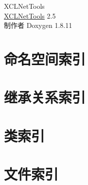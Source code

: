 \documentclass[twoside]{book}
\newcommand{\+}{\discretionary{\mbox{\scriptsize$\hookleftarrow$}}{}{}}
\newcommand{\clearemptydoublepage}{%
  \newpage{\pagestyle{empty}\cleardoublepage}%
}
\begin{document}
\hypersetup{pageanchor=false,
             bookmarksnumbered=true,
             pdfencoding=unicode
            }
\begin{titlepage}
\vspace*{7cm}
\begin{center}%
{\Large X\+C\+L\+Net\+Tools \\[1ex]\large \hyperlink{namespace_x_c_l_net_tools}{X\+C\+L\+Net\+Tools} 2.\+5 }\\
\vspace*{1cm}
{\large 制作者 Doxygen 1.8.11}\\
\end{center}
\end{titlepage}
\clearemptydoublepage
\tableofcontents
\clearemptydoublepage
{}
\hypersetup{pageanchor=true}

\chapter{命名空间索引}

\chapter{继承关系索引}

\chapter{类索引}

\chapter{文件索引}

\end{document}
